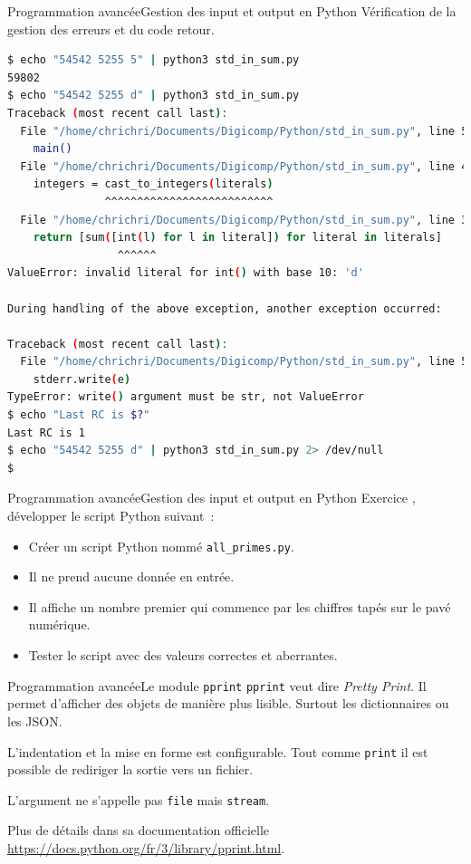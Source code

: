 \documentclass{beamer}
\begin{document}
    \begin{frame}[fragile]{Programmation avancée}{Gestion des input et output en Python}
        Vérification de la gestion des erreurs et du code retour.
        \begin{lstlisting}[language=Bash,basicstyle=\tiny\ttfamily]
$ echo "54542 5255 5" | python3 std_in_sum.py
59802
$ echo "54542 5255 d" | python3 std_in_sum.py
Traceback (most recent call last):
  File "/home/chrichri/Documents/Digicomp/Python/std_in_sum.py", line 53, in <module>
    main()
  File "/home/chrichri/Documents/Digicomp/Python/std_in_sum.py", line 46, in main
    integers = cast_to_integers(literals)
               ^^^^^^^^^^^^^^^^^^^^^^^^^^
  File "/home/chrichri/Documents/Digicomp/Python/std_in_sum.py", line 37, in cast_to_integers
    return [sum([int(l) for l in literal]) for literal in literals]
                 ^^^^^^
ValueError: invalid literal for int() with base 10: 'd'

During handling of the above exception, another exception occurred:

Traceback (most recent call last):
  File "/home/chrichri/Documents/Digicomp/Python/std_in_sum.py", line 56, in <module>
    stderr.write(e)
TypeError: write() argument must be str, not ValueError
$ echo "Last RC is $?"
Last RC is 1
$ echo "54542 5255 d" | python3 std_in_sum.py 2> /dev/null
$
        \end{lstlisting}
    \end{frame}

    \begin{frame}{Programmation avancée}{Gestion des input et output en Python}
        Exercice \execcounterdispinc{}, développer le script Python suivant~:
        \begin{itemize}
            \item Créer un script Python nommé \lstinline{all_primes.py}.
            \item Il ne prend aucune donnée en entrée.
            \item Il affiche un nombre premier qui commence par les chiffres tapés sur le pavé numérique.
            \item Tester le script avec des valeurs correctes et aberrantes.
        \end{itemize}
    \end{frame}

    \begin{frame}{Programmation avancée}{Le module \lstinline{pprint}}
        \lstinline{pprint} veut dire \textit{Pretty Print}.
        \bigbreak
        Il permet d'afficher des objets de manière plus lisible. Surtout les dictionnaires ou les JSON.

        L'indentation et la mise en forme est configurable.
        Tout comme \lstinline{print} il est possible de rediriger la sortie vers un fichier.
        \begin{dangercolorbox}
            L'argument ne s'appelle pas \lstinline{file} mais \lstinline{stream}.
        \end{dangercolorbox}
        \bigbreak
        Plus de détails dans sa documentation officielle \url{https://docs.python.org/fr/3/library/pprint.html}.
    \end{frame}
\end{document}

